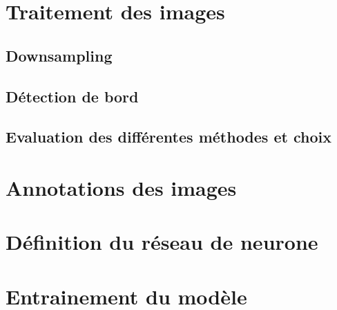 \section{Traitement des images}
\subsection{Downsampling}
\subsection{Détection de bord}
\subsection{Evaluation des différentes méthodes et choix}

\section{Annotations des images}

\section{Définition du réseau de neurone}

\section{Entrainement du modèle}





